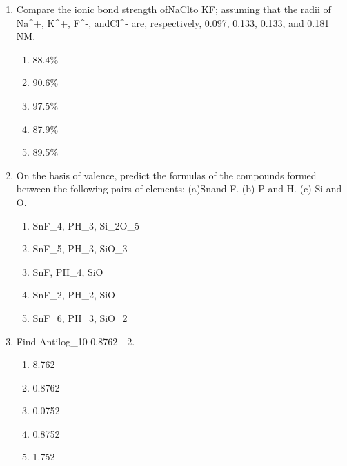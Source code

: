 \documentclass[12pt]{article}
\begin{document}
\begin{enumerate}[label=\arabic*.]
\begin{enumerate}[label=(\alph*)]
    \item Trigonal bipyramidal
\end{enumerate}
\item Compare the ionic bond strength ofNaClto KF; assuming that the radii of Na\^{}+, K\^{}+, F\^{}-,
andCl\^{}- are, respectively, 0.097, 0.133, 0.133, and 0.181 NM.
\begin{enumerate}[label=(\alph*)]
    \item 88.4\%
    \item 90.6\%
    \item 97.5\%
    \item 87.9\%
    \item 89.5\%
\end{enumerate}
\item On the basis of valence, predict the formulas of the compounds formed between the
following pairs of elements: (a)Snand F. (b) P and H. (c) Si and O.
\begin{enumerate}[label=(\alph*)]
    \item SnF\_4, PH\_3, Si\_2O\_5
    \item SnF\_5, PH\_3, SiO\_3
    \item SnF, PH\_4, SiO
    \item SnF\_2, PH\_2, SiO
    \item SnF\_6, PH\_3, SiO\_2
\end{enumerate}
\item Find Antilog\_10 0.8762 - 2.
\begin{enumerate}[label=(\alph*)]
    \item 8.762
    \item 0.8762
    \item 0.0752
    \item 0.8752
    \item 1.752
\end{enumerate}
\end{enumerate}
\end{document}
